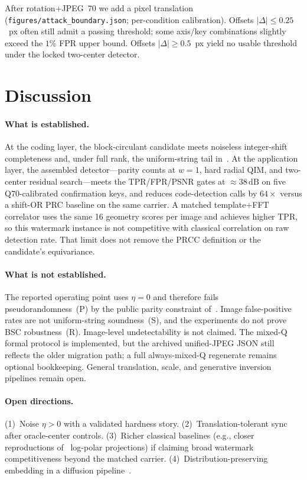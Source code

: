 \documentclass[11pt,a4paper]{article}
\newcommand{\PRCC}{\ensuremath{\mathrm{PRCC}}}
\begin{document}
After rotation+JPEG~70 we add a pixel translation
(\texttt{figures/attack\_boundary.json}; per-condition calibration).
Offsets \(\lvert\Delta\rvert\le 0.25\)~px often still admit a passing threshold; some
axis/key combinations slightly exceed the \(1\%\) FPR upper bound.
Offsets \(\lvert\Delta\rvert\ge 0.5\)~px yield no usable threshold under the locked
two-center detector.

\section{Discussion}
\label{sec:discussion}

\paragraph{What is established.}
At the coding layer, the block-circulant candidate meets noiseless integer-shift
completeness and, under full rank, the uniform-string tail in~.
At the application layer, the assembled detector---parity counts at \(w=1\), hard
radial QIM, and two-center residual search---meets the TPR/FPR/PSNR gates at
\(\approx 38\,\mathrm{dB}\) on five Q70-calibrated confirmation keys, and reduces
code-detection calls by \(64\times\) versus a shift-OR PRC baseline on the same
carrier.
A matched template+FFT correlator uses the same 16 geometry scores per image and
achieves higher TPR, so this watermark instance is not competitive with classical
correlation on raw detection rate.
That limit does not remove the \PRCC{} definition or the candidate's equivariance.

\paragraph{What is not established.}
The reported operating point uses \(\eta=0\) and therefore fails
pseudorandomness~(P) by the public parity constraint of~.
Image false-positive rates are not uniform-string soundness~(S), and the
experiments do not prove BSC robustness~(R).
Image-level undetectability is not claimed.
The mixed-Q formal protocol is implemented, but the archived unified-JPEG JSON still
reflects the older migration path; a full always-mixed-Q regenerate remains optional
bookkeeping.
General translation, scale, and generative inversion pipelines remain open.

\paragraph{Open directions.}
(1)~Noise \(\eta>0\) with a validated hardness story.
(2)~Translation-tolerant sync after oracle-center controls.
(3)~Richer classical baselines (e.g., closer reproductions of~\cite{lin2001rst}
log-polar projections) if claiming broad watermark competitiveness beyond the matched
carrier.
(4)~Distribution-preserving embedding in a diffusion pipeline~\cite{gunn2024undetectable}.
\end{document}
